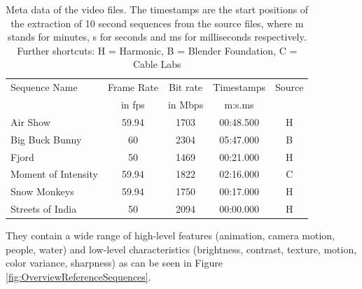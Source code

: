 \begin{table}[!t]
	\renewcommand{\arraystretch}{1.3}
	\centering
	\caption{Meta data of the video files. The timestamps are the start positions of the extraction of 10 second sequences from the source files, where m stands for minutes, s for seconds and ms for milliseconds respectively. Further shortcuts: H = Harmonic, B = Blender Foundation, C = Cable Labs}
	\label{tab:Specifications}
	\begin{tabular}{lcccc}
		\toprule
		Sequence Name       & Frame Rate & Bit rate & Timestamps& Source\\
		& in fps  			& in Mbps    & m:s.ms   & \\
		\midrule
		Air Show            & 59.94    & 1703 & 00:48.500  &   H  \\
		Big Buck Bunny      & 60       & 2304 & 05:47.000  &   B  \\
		Fjord               & 50       & 1469 & 00:21.000  &   H  \\
		Moment of Intensity & 59.94    & 1822 & 02:16.000  &   C \\
		Snow Monkeys        & 59.94    & 1750 & 00:17.000  &   H  \\
		Streets of India    & 50       & 2094 & 00:00.000  &   H  \\
		\bottomrule
	\end{tabular}
\end{table}

They contain a wide range of high-level features (animation, camera motion, people, water) and low-level characteristics (brightness, contrast, texture, motion, color variance, sharpness) as can be seen in Figure \ref{fig:OverviewReferenceSequences}.

